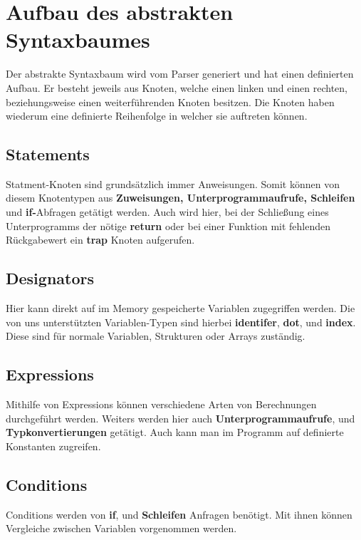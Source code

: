 \section{Aufbau des abstrakten Syntaxbaumes}
\label{sec:interpr-ast}
Der abstrakte Syntaxbaum wird vom Parser generiert und hat einen definierten Aufbau. Er besteht jeweils aus Knoten, welche einen linken und einen rechten, beziehungsweise einen weiterführenden Knoten besitzen. Die Knoten haben wiederum eine definierte Reihenfolge in welcher sie auftreten können. 

\subsection{Statements}
Statment-Knoten sind grundsätzlich immer Anweisungen. Somit können von diesem Knotentypen aus \textbf{Zuweisungen, Unterprogrammaufrufe, Schleifen} und \textbf{if-}Abfragen getätigt werden. Auch wird hier, bei der Schließung eines Unterprogramms der nötige \textbf{return} oder bei einer Funktion mit fehlenden Rückgabewert ein \textbf{trap} Knoten aufgerufen. 



\subsection{Designators}
Hier kann direkt auf im Memory gespeicherte Variablen zugegriffen werden. Die von uns unterstützten Variablen-Typen sind hierbei \textbf{identifer}, \textbf{dot}, und \textbf{index}. Diese sind für normale Variablen, Strukturen oder Arrays zuständig.

\subsection{Expressions}
\label{sec:expressions}
Mithilfe von Expressions können verschiedene Arten von Berechnungen durchgeführt werden. Weiters werden hier auch \textbf{Unterprogrammaufrufe}, und \textbf{Typkonvertierungen} getätigt. Auch kann man im Programm auf definierte Konstanten zugreifen.

\subsection{Conditions}
Conditions werden von \textbf{if}, und \textbf{Schleifen} Anfragen benötigt. Mit ihnen können Vergleiche zwischen Variablen vorgenommen werden.

